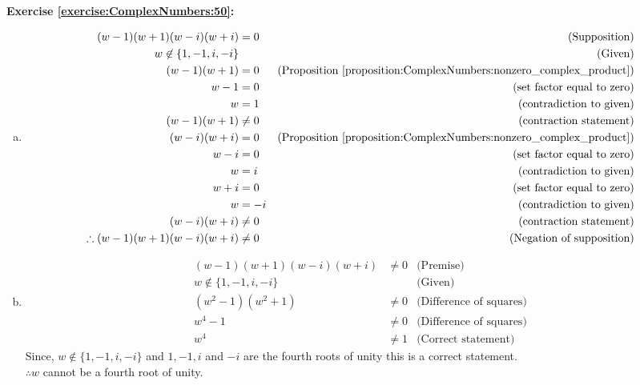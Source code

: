 \noindent\textbf{Exercise \ref{exercise:ComplexNumbers:50}:} %
\begin{enumerate}[(a)]
\item
\begin{align*}
(w - 1)(w + 1)(w - i)(w + i) &= 0		&\text{(Supposition)}\\
w \not\in \{1, -1, i, -i\} &	&\text{(Given)}\\
(w - 1)(w + 1) &= 0 		&\text{(Proposition \ref{proposition:ComplexNumbers:nonzero_complex_product})}\\
w - 1 &= 0		&\text{(set factor equal to zero)}\\
w &= 1		&\text{(contradiction to given)}\\
(w - 1)(w + 1) &\neq 0		&\text{(contraction statement)}\\
(w - i)(w + i) &= 0 		&\text{(Proposition \ref{proposition:ComplexNumbers:nonzero_complex_product})}\\
w - i &= 0		&\text{(set factor equal to zero)}\\
w &= i		&\text{(contradiction to given)}\\
w + i &= 0		&\text{(set factor equal to zero)}\\
w &= -i		&\text{(contradiction to given)}\\
(w - i)(w + i) &\neq 0		&\text{(contraction statement)}\\
\therefore (w - 1)(w + 1)(w - i)(w + i) &\neq 0	&\text{(Negation of supposition)}
\end{align*}

\item
\begin{align*}
(w - 1)(w + 1)(w - i)(w + i) &\neq 0	&\text{(Premise)}\\
w \not\in \{1, -1, i, -i\} &	&\text{(Given)}\\
(w^{2} - 1)(w^{2} + 1) &\neq 0 		&\text{(Difference of squares)}\\
w^{4} - 1 &\neq 0		&\text{(Difference of squares)}\\
w^{4} &\neq 1		&\text{(Correct statement)}
\end{align*}
Since, $w \not\in \{1, -1, i, -i\}$ and $1, -1, i$ and $-i$ are the fourth roots of unity this is a correct statement.\\
$\therefore w$ cannot be a fourth root of unity.
\end{enumerate}


